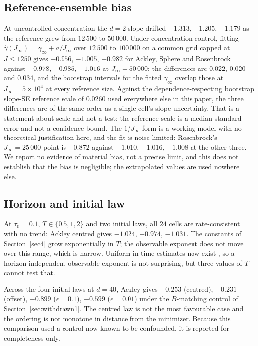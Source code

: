 \documentclass[pdflatex,sn-mathphys-num]{sn-jnl}
\theoremstyle{thmstyleone}
\theoremstyle{thmstyletwo}
\theoremstyle{thmstylethree}
\begin{document}
\subsection{Reference-ensemble bias}\label{sec:refbias}

At uncontrolled concentration the $d=2$ slope drifted $-1.313$, $-1.205$, $-1.179$ as the reference grew from $12\,500$ to $50\,000$. Under concentration control, fitting $\hat\gamma(J_\infty)=\gamma_\infty+a/J_\infty$ over $12\,500$ to $100\,000$ on a common grid capped at $J\le1250$ gives $-0.956$, $-1.005$, $-0.982$ for Ackley, Sphere and Rosenbrock against $-0.978$, $-0.985$, $-1.016$ at $J_\infty=50\,000$; the differences are $0.022$, $0.020$ and $0.034$, and the bootstrap intervals for the fitted $\gamma_\infty$ overlap those at $J_\infty=5\times10^4$ at every reference size. Against the dependence-respecting bootstrap slope-SE reference scale of $0.0260$ used everywhere else in this paper, the three differences are of the same order as a single cell's slope uncertainty. That is a statement about scale and not a test: the reference scale is a median standard error and not a confidence bound. The $1/J_\infty$ form is a working model with no theoretical justification here, and the fit is noise-limited: Rosenbrock's $J_\infty=25\,000$ point is $-0.872$ against $-1.010$, $-1.016$, $-1.008$ at the other three. We report no evidence of material bias, not a precise limit, and this does not establish that the bias is negligible; the extrapolated values are used nowhere else.

\subsection{Horizon and initial law}\label{sec:horizon}

At $\tau_0=0.1$, $T\in\{0.5,1,2\}$ and two initial laws, all $24$ cells are rate-consistent with no trend: Ackley centred gives $-1.024$, $-0.974$, $-1.031$. The constants of Section~\ref{sec4} grow exponentially in $T$; the observable exponent does not move over this range, which is narrow. Uniform-in-time estimates now exist \cite{hk2025,bez2026,ghkv2025}, so a horizon-independent observable exponent is not surprising, but three values of $T$ cannot test that.

Across the four initial laws at $d=40$, Ackley gives $-0.253$ (centred), $-0.231$ (offset), $-0.899$ ($\epsilon=0.1$), $-0.599$ ($\epsilon=0.01$) under the $B$-matching control of Section~\ref{sec:withdrawn1}. The centred law is not the most favourable case and the ordering is not monotone in distance from the minimizer. Because this comparison used a control now known to be confounded, it is reported for completeness only.
\end{document}
